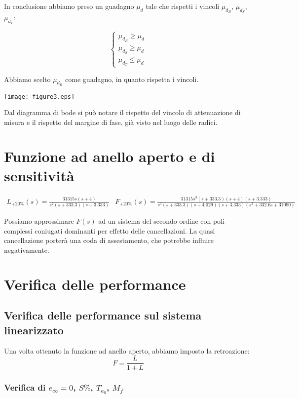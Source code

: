 \documentclass{article}
\begin{document}
In conclusione abbiamo preso un guadagno $\mu_d$ tale che rispetti i vincoli $\mu_{d_B}$, $\mu_{d_S}$, $\mu_{d_T}$:

$$
\begin{cases}
    \mu_{d_B}\geq\mu_d\\
    \mu_{d_S}\geq\mu_d\\
    \mu_{d_T}\leq\mu_d
\end{cases}
$$

Abbiamo scelto $\mu_{d_B}$ come guadagno, in quanto rispetta i vincoli.


\begin{center}
    \texttt{[image: figure3.eps]}
\end{center}

Dal diagramma di bode si può notare il rispetto del vincolo di attenuazione di misura e il rispetto del margine di fase, già visto nel luogo delle radici.

\section{Funzione ad anello aperto e di sensitività}

$$
\begin{array}{cc}
    L_{+20\%}(s)=\frac{31315 s (s+4)}{s^2 (s+333.3) (s+3.333)} & F_{+20\%}(s)=\frac{31315 s^3 (s+333.3) (s+4) (s+3.333)}{s^3 (s+333.3) (s+4.029) (s+3.333) (s^2 + 332.6s + 31090)}
\end{array}
$$

Possiamo approssimare $F(s)$ ad un sistema del secondo ordine con poli complessi coniugati dominanti per effetto delle cancellazioni. La quasi cancellazione porterà una coda di assestamento, che potrebbe influire negativamente.


\newpage

\section{Verifica delle performance}

\subsection{Verifica delle performance sul sistema linearizzato}

Una volta ottenuto la funzione ad anello aperto, abbiamo imposto la retroazione:
$$
F = \frac{L}{1+L}
$$

\subsubsection{Verifica di $e_\infty=0$, $S\%$, $T_{a_0}$, $M_f$}
\end{document}
